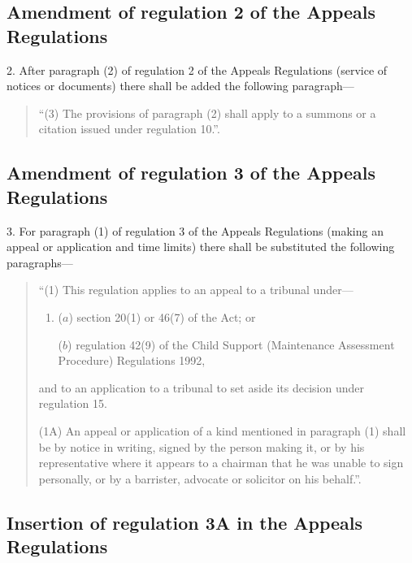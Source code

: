 \documentclass[a4paper]{article}
\begin{document}
\subsection[2. Amendment of regulation 2 of the Appeals Regulations]{Amendment of regulation 2 of the Appeals Regulations}

2.  After paragraph (2) of regulation 2 of the Appeals Regulations (service of notices or documents) there shall be added the following paragraph—
\begin{quotation}
“(3) The provisions of paragraph (2) shall apply to a summons or a citation issued under regulation 10.”.
\end{quotation}

\subsection[3. Amendment of regulation 3 of the Appeals Regulations]{Amendment of regulation 3 of the Appeals Regulations}

3.  For paragraph (1) of regulation 3 of the Appeals Regulations (making an appeal or application and time limits) there shall be substituted the following paragraphs—
\begin{quotation}
“(1) This regulation applies to an appeal to a tribunal under—
\begin{enumerate}\item[]
($a$) section 20(1) or 46(7) of the Act; or

($b$) regulation 42(9) of the Child Support (Maintenance Assessment Procedure) Regulations 1992,
\end{enumerate}
and to an application to a tribunal to set aside its decision under regulation 15.

(1A) An appeal or application of a kind mentioned in paragraph (1) shall be by notice in writing, signed by the person making it, or by his representative where it appears to a chairman that he was unable to sign personally, or by a barrister, advocate or solicitor on his behalf.”.
\end{quotation}

\subsection[4. Insertion of regulation 3A in the Appeals Regulations]{Insertion of regulation 3A in the Appeals Regulations}
\end{document}
